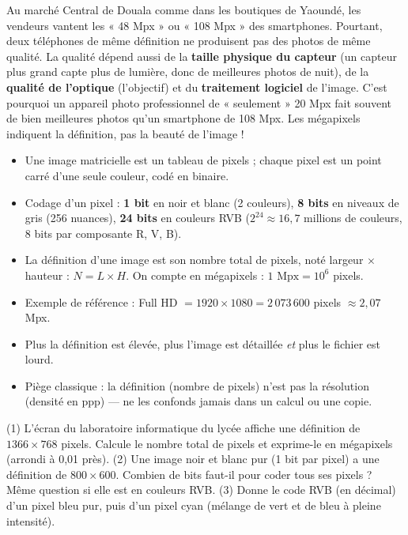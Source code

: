 \documentclass[11pt]{article}
\newcommand{\cle}[1]{{\popxbold\color{popdark}#1}}
\begin{document}
\begin{savaistu}
Au marché Central de Douala comme dans les boutiques de Yaoundé, les vendeurs vantent les « 48 Mpx » ou « 108 Mpx » des smartphones. Pourtant, deux téléphones de même définition ne produisent pas des photos de même qualité. La qualité dépend aussi de la \textbf{taille physique du capteur} (un capteur plus grand capte plus de lumière, donc de meilleures photos de nuit), de la \textbf{qualité de l'optique} (l'objectif) et du \textbf{traitement logiciel} de l'image. C'est pourquoi un appareil photo professionnel de « seulement » 20 Mpx fait souvent de bien meilleures photos qu'un smartphone de 108 Mpx. Les mégapixels indiquent la définition, pas la beauté de l'image !
\end{savaistu}

\begin{aretenir}
\begin{itemize}
\item Une image \cle{matricielle} est un tableau de \cle{pixels} ; chaque pixel est un point carré d'une seule couleur, codé en binaire.
\item Codage d'un pixel : \textbf{1 bit} en noir et blanc (2 couleurs), \textbf{8 bits} en niveaux de gris (256 nuances), \textbf{24 bits} en couleurs RVB ($2^{24} \approx 16{,}7$ millions de couleurs, 8 bits par composante R, V, B).
\item La \cle{définition} d'une image est son nombre total de pixels, noté largeur $\times$ hauteur : $N = L \times H$. On compte en mégapixels : $1 \text{ Mpx} = 10^6$ pixels.
\item Exemple de référence : Full HD $= 1920 \times 1080 = 2\,073\,600$ pixels $\approx 2{,}07$ Mpx.
\item Plus la définition est élevée, plus l'image est détaillée \emph{et} plus le fichier est lourd.
\item Piège classique : la définition (nombre de pixels) n'est pas la résolution (densité en ppp) — ne les confonds jamais dans un calcul ou une copie.
\end{itemize}
\end{aretenir}

\begin{exercice}
(1) L'écran du laboratoire informatique du lycée affiche une définition de $1366 \times 768$ pixels. Calcule le nombre total de pixels et exprime-le en mégapixels (arrondi à 0,01 près).
(2) Une image noir et blanc pur (1 bit par pixel) a une définition de $800 \times 600$. Combien de bits faut-il pour coder tous ses pixels ? Même question si elle est en couleurs RVB.
(3) Donne le code RVB (en décimal) d'un pixel bleu pur, puis d'un pixel cyan (mélange de vert et de bleu à pleine intensité).
\end{exercice}
\end{document}
